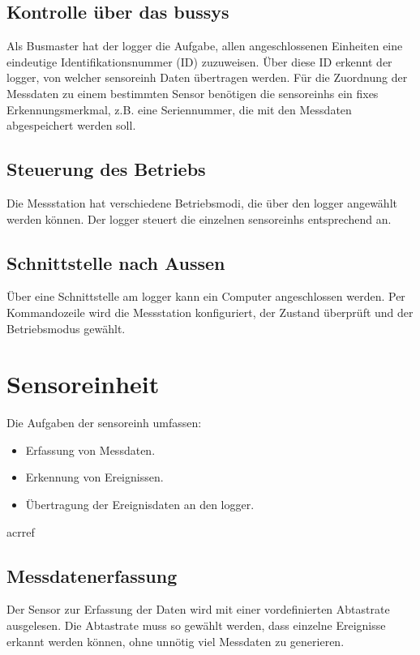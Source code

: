 \subsection{Kontrolle über das \gls{bussys}}
Als Busmaster hat der \gls{logger} die Aufgabe, allen angeschlossenen Einheiten eine eindeutige Identifikationsnummer (ID) zuzuweisen. Über diese ID erkennt der \gls{logger}, von welcher \gls{sensoreinh} Daten übertragen werden. Für die Zuordnung der Messdaten zu einem bestimmten Sensor benötigen die \glspl{sensoreinh} ein fixes Erkennungsmerkmal, z.B. eine Seriennummer, die mit den Messdaten abgespeichert werden soll.


\subsection{Steuerung des Betriebs}
Die Messstation hat verschiedene Betriebsmodi, die über den \gls{logger} angewählt werden können. Der \gls{logger} steuert die einzelnen \glspl{sensoreinh} entsprechend an.


\subsection{Schnittstelle nach Aussen}
Über eine Schnittstelle am \gls{logger} kann ein Computer angeschlossen werden. Per Kommandozeile wird die Messstation konfiguriert, der Zustand überprüft und der Betriebsmodus gewählt.


\section{Sensoreinheit}
Die Aufgaben der \gls{sensoreinh} umfassen:
\begin{itemize}
\item Erfassung von Messdaten.
\item Erkennung von Ereignissen.
\item Übertragung der Ereignisdaten an den \gls{logger}.
\end{itemize}

\gls{acrref}
\subsection{Messdatenerfassung}
Der Sensor zur Erfassung der Daten wird mit einer vordefinierten Abtastrate ausgelesen. Die Abtastrate muss so gewählt werden, dass einzelne Ereignisse erkannt werden können, ohne unnötig viel Messdaten zu generieren.

